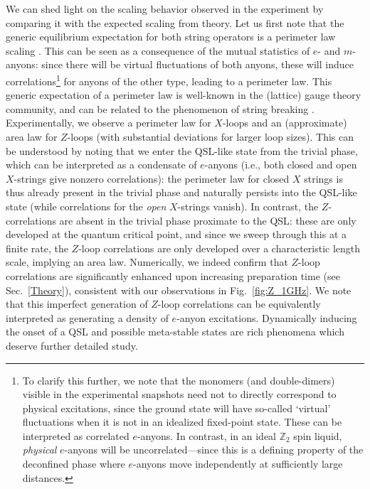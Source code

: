 \documentclass[twocolumn,amssymb,secnumarabic, prl, aps, nofootinbib]{revtex4-1}
\begin{document}
We can shed light on the scaling behavior observed in the experiment by comparing it with the expected scaling from theory. Let us first note that the generic equilibrium expectation for both string operators is a perimeter law scaling \cite{Gregor11}. This can be seen as a consequence of the mutual statistics of $e$- and $m$- anyons: since there will be virtual fluctuations of both anyons, these will induce correlations\footnote{To clarify this further, we note that the monomers (and double-dimers) visible in the experimental snapshots need not to directly correspond to physical excitations, since the ground state will have so-called `virtual' fluctuations when it is not in an idealized fixed-point state. These can be interpreted  as correlated $e$-anyons. In contrast, in an ideal $\mathbb Z_2$ spin liquid, \emph{physical} $e$-anyons will be uncorrelated---since this is a defining property of the deconfined phase where $e$-anyons move independently at sufficiently large distances.}
for anyons of the other type, leading to a perimeter law. This generic expectation of a perimeter law is well-known in the (lattice) gauge theory community, and can be related to the phenomenon of string breaking \cite{Fradkin79}. Experimentally, we observe a perimeter law for $X$-loops and an (approximate) area law for $Z$-loops (with substantial deviations for larger loop sizes). This  can be understood by noting that we enter the QSL-like state from the trivial phase, which can be interpreted as a condensate of $e$-anyons (i.e., both closed and open $X$-strings give nonzero correlations): the perimeter law for closed  $X$ strings is thus already present in the trivial phase and naturally persists into the QSL-like state (while correlations for the \emph{open} $X$-strings vanish). In contrast, the $Z$-correlations are absent in the trivial phase proximate to the QSL: these are only developed at the quantum critical point, and since we sweep through this at a finite rate, the $Z$-loop correlations are only developed over a characteristic length scale, implying an area law. Numerically, we indeed confirm that $Z$-loop correlations are significantly enhanced upon increasing preparation time (see Sec.~\ref{Theory}), consistent with our observations in Fig.~\ref{fig:Z_1GHz}. We note that this imperfect generation of $Z$-loop correlations can be equivalently interpreted as generating a density of $e$-anyon excitations. Dynamically inducing the onset of a QSL and possible meta-stable states are rich phenomena which deserve further detailed study.
\end{document}
